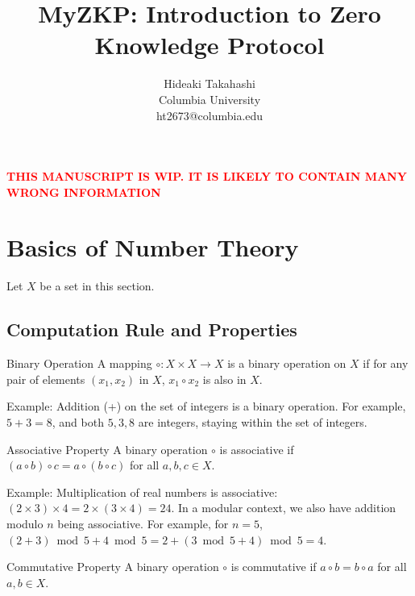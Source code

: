 \documentclass{article}
\title{MyZKP: Introduction to Zero Knowledge Protocol
}
\author{
    Hideaki Takahashi \\
    Columbia University \\
    ht2673@columbia.edu
}
\begin{document}
\maketitle






\textbf{\textcolor{red}{THIS MANUSCRIPT IS WIP. IT IS LIKELY TO CONTAIN MANY WRONG INFORMATION}}

\tableofcontents

\section{Basics of Number Theory}

Let $X$ be a set in this section.

\subsection{Computation Rule and Properties}

\begin{definition}{Binary Operation}{}
A mapping $\circ: X \times X \rightarrow X$ is a binary operation on $X$ if for any pair of elements $(x_1, x_2)$ in $X$, $x_1 \circ x_2$ is also in $X$.
\end{definition}

Example: Addition (+) on the set of integers is a binary operation. For example, $5 + 3 = 8$, and both $5, 3, 8$ are integers, staying within the set of integers.

\begin{definition}{Associative Property}{}
A binary operation $\circ$ is associative if $(a \circ b) \circ c = a \circ (b \circ c)$ for all $a, b, c \in X$.
\end{definition}

Example: Multiplication of real numbers is associative: $(2 \times 3) \times 4 = 2 \times (3 \times 4) = 24$. In a modular context, we also have addition modulo $n$ being associative. For example, for $n = 5$, $(2 + 3) \bmod 5 + 4 \bmod 5 = 2 + (3 \bmod 5 + 4) \bmod 5 = 4$.

\begin{definition}{Commutative Property}{}
A binary operation $\circ$ is commutative if $a \circ b = b \circ a$ for all $a, b \in X$.
\end{definition}
\end{document}
